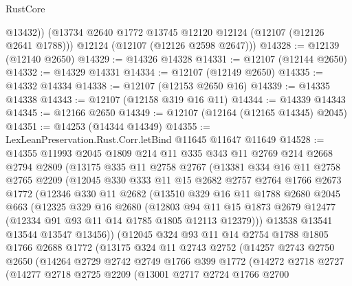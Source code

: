 \begin{lexlean}{RustCore}
\begin{coremodule}
          @13432))
      (@13734 @2640 @1772 @13745 @12120 @12124 (@12107 (@12126 @2641 @1788)))
      @12124
      (@12107 (@12126 @2598 @2647)))
@14328 := @12139 (@12140 @2650)
@14329 := @14326 @14328
@14331 := @12107 (@12144 @2650)
@14332 := @14329 @14331
@14334 := @12107 (@12149 @2650)
@14335 := @14332 @14334
@14338 := @12107 (@12153 @2650 @16)
@14339 := @14335 @14338
@14343 := @12107 (@12158 @319 @16 @11)
@14344 := @14339 @14343
@14345 := @12166 @2650
@14349 := @12107 (@12164 (@12165 @14345) @2045)
@14351 := @14253 (@14344 @14349)
@14355 := LexLeanPreservation.Rust.Corr.letBind @11645 @11647 @11649
@14528 := @14355
    @11993
    @2045
    @1809
    @214
    @11
    @335
    @343
    @11
    @2769
    @214
    @2668
    @2794
    @2809
    (@13175
      @335
      @11
      @2758
      @2767
      (@13381
        @334
        @16
        @11
        @2758
        @2765
        @2209
        (@12045
          @330
          @333
          @11
          @15
          @2682
          @2757
          @2764
          @1766
          @2673
          @1772
          (@12346
            @330
            @11
            @2682
            (@13510
              @329
              @16
              @11
              @1788
              @2680
              @2045
              @663
              (@12325
                @329
                @16
                @2680
                (@12803
                  @94
                  @11
                  @15
                  @1873
                  @2679
                  @12477
                  (@12334 @91 @93 @11 @14 @1785 @1805 @12113 @12379)))
              @13538
              @13541
              @13544
              @13547
              @13456))
          (@12045
            @324
            @93
            @11
            @14
            @2754
            @1788
            @1805
            @1766
            @2688
            @1772
            (@13175
              @324
              @11
              @2743
              @2752
              (@14257
                @2743
                @2750
                @2650
                (@14264
                  @2729
                  @2742
                  @2749
                  @1766
                  @399
                  @1772
                  (@14272
                    @2718
                    @2727
                    (@14277
                      @2718
                      @2725
                      @2209
                      (@13001
                        @2717
                        @2724
                        @1766
                        @2700

\end{coremodule}
\end{lexlean}
